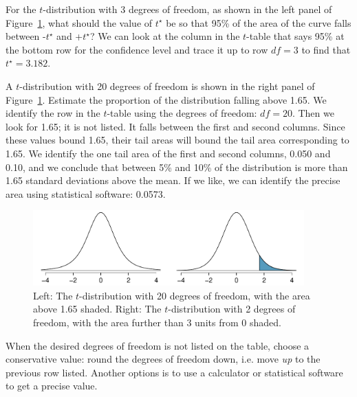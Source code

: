 \begin{example}{For the $t$-distribution with 3 degrees of freedom, as shown in the left panel of Figure~\ref{tDistDF3_and_20}, what should the value of $t^{\star}$ be so that 95\% of the area of the curve falls between -$t^{\star}$ and +$t^{\star}$?}
We can look at the column in the $t$-table that says 95\% at the bottom row for the confidence level and trace it up to row $df = 3$ to find that $t^{\star} = 3.182$.
\end{example}

\begin{example}{A $t$-distribution with 20 degrees of freedom is shown in the right panel of Figure~\ref{tDistDF3_and_20}. Estimate the proportion of the distribution falling above 1.65.}
We identify the row in the $t$-table using the degrees of freedom: $df=20$. Then we look for 1.65; it is not listed. It falls between the first and second columns. Since these values bound 1.65, their tail areas will bound the tail area corresponding to 1.65. We identify the one tail area of the first and second columns, 0.050 and 0.10, and we conclude that between 5\% and 10\% of the distribution is more than 1.65 standard deviations above the mean. If we like, we can identify the precise area using statistical software: 0.0573.
\end{example}

\begin{figure}
\centering
\includegraphics[width=0.93\textwidth]{ch_inference_for_means/figures/tDistDF3_and_20/tDistDF3_and_20}
\caption{Left: The $t$-distribution with 20 degrees of freedom, with the area above 1.65 shaded. Right: The $t$-distribution with 2 degrees of freedom, with the area further than 3 units from 0 shaded.}
\label{tDistDF3_and_20}
\end{figure}

\textA{\pagebreak}

When the desired degrees of freedom is not listed on the table, choose a conservative value: round the degrees of freedom down, i.e. move \emph{up} to the previous row listed. Another options is to use a calculator or statistical software to get a precise value.

